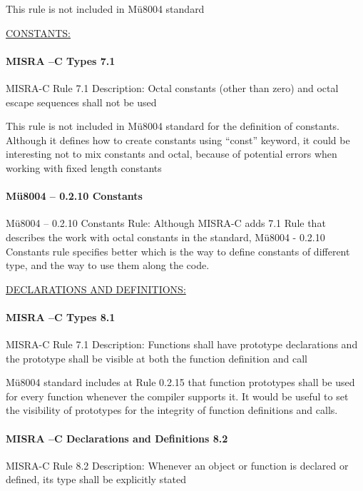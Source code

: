 This rule is not included in Mü8004 standard

\begin{center}
\textsc{\underline{CONSTANTS:}}
\end{center}

\paragraph{MISRA –C Types 7.1}
MISRA-C Rule 7.1 Description: Octal constants (other than zero) and octal escape sequences shall not be used

This rule is not included in Mü8004 standard for the definition of constants. Although it defines how to create constants using “const” keyword, it could be interesting not to mix constants and octal, because of potential errors when working with fixed length constants

\paragraph{Mü8004 – 0.2.10 Constants}
Mü8004 – 0.2.10 Constants Rule: Although MISRA-C adds 7.1 Rule that describes the work with octal constants in the standard, Mü8004 - 0.2.10 Constants rule specifies better which is the way to define constants of different type, and the way to use them along the code.

\begin{center}
\textsc{\underline{DECLARATIONS AND DEFINITIONS:}}
\end{center}

\paragraph{MISRA –C Types 8.1}
MISRA-C Rule 7.1 Description: Functions shall have prototype declarations and the prototype shall be visible at both the function definition and call

Mü8004 standard includes at Rule 0.2.15 that function prototypes shall be used for every function whenever the compiler supports it. It would be useful to set the visibility of prototypes for the integrity of function definitions and calls.

\paragraph{MISRA –C Declarations and Definitions 8.2}
MISRA-C Rule 8.2 Description: Whenever an object or function is declared or defined, its type shall be explicitly stated

